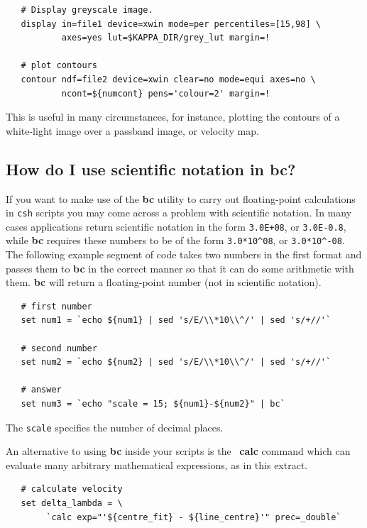 \documentclass[twoside,11pt]{article}
\newcommand{\xref}[3]{#1}
\begin{document}
{\small\begin{verbatim}
   # Display greyscale image.
   display in=file1 device=xwin mode=per percentiles=[15,98] \
           axes=yes lut=$KAPPA_DIR/grey_lut margin=! 
	   
   # plot contours
   contour ndf=file2 device=xwin clear=no mode=equi axes=no \
           ncont=${numcont} pens='colour=2' margin=! 
\end{verbatim}\normalsize

This is useful in many circumstances, for instance, plotting the
contours of a white-light image over a passband image, or velocity
map.

\subsection{How do I use scientific notation in {\bf bc}?}

If you want to make use of the {\bf bc} utility to carry out
floating-point calculations in {\tt csh} scripts you may come across a
problem with scientific notation.  In many cases applications return
scientific notation in the form {\tt 3.0E+08}, or {\tt 3.0E-0.8},
while {\bf bc} requires these numbers to be of the form
\verb+3.0*10^08+, or \verb+3.0*10^-08+.  The following example segment
of code takes two numbers in the first format and passes them to {\bf
bc} in the correct manner so that it can do some arithmetic with them.
{\bf bc} will return a floating-point number (not in scientific
notation).

\small\begin{verbatim}
   # first number
   set num1 = `echo ${num1} | sed 's/E/\\*10\\^/' | sed 's/+//'`
   
   # second number
   set num2 = `echo ${num2} | sed 's/E/\\*10\\^/' | sed 's/+//'`
   
   # answer
   set num3 = `echo "scale = 15; ${num1}-${num2}" | bc`
\end{verbatim}\normalsize

The {\tt scale} specifies the number of decimal places.

An alternative to using {\bf bc} inside your scripts is the \KAPPA\
\xref{{\bf calc}}{sun95}{CALC} command which can evaluate many arbitrary
mathematical expressions, as in this extract.

\small\begin{verbatim}
   # calculate velocity
   set delta_lambda = \
        `calc exp="'${centre_fit} - ${line_centre}'" prec=_double`


\end{verbatim}}
\end{document}
